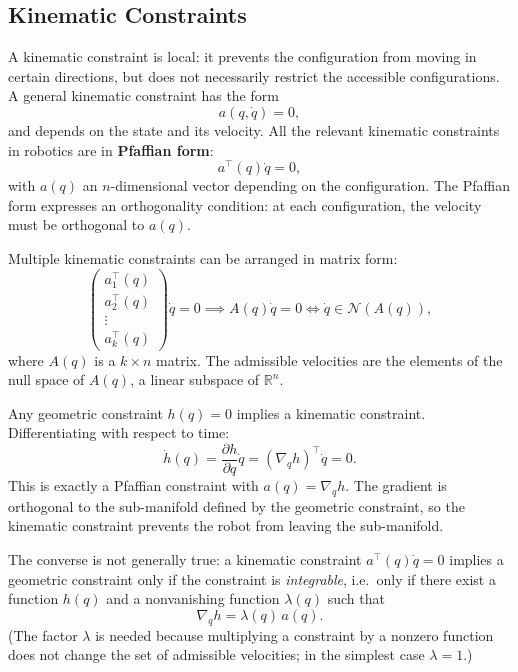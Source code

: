 \subsection{Kinematic Constraints}
\label{subsec:kinematic-constraints}

A kinematic constraint is local: it prevents the configuration from
moving in certain directions, but does not necessarily restrict the
accessible configurations. A general kinematic constraint has the form
\begin{equation}
    a(q, \dot{q}) = 0,
\end{equation}
and depends on the state and its velocity. All the relevant kinematic
constraints in robotics are in \textbf{Pfaffian form}:
\begin{equation}
\label{eq:pfaffian}
    a^\top(q) \dot{q} = 0,
\end{equation}
with \( a(q) \) an \( n \)-dimensional vector depending on the
configuration. The Pfaffian form expresses an orthogonality condition:
at each configuration, the velocity must be orthogonal to \( a(q) \).

Multiple kinematic constraints can be arranged in matrix form:
\begin{equation}
\begin{pmatrix}
    a_1^\top(q) \\
    a_2^\top(q) \\
    \vdots \\
    a_k^\top(q)
\end{pmatrix}
\dot{q} = 0
\implies
A(q) \dot{q} = 0
\iff
\dot{q} \in \mathcal{N}(A(q)),
\end{equation}
where \( A(q) \) is a \( k \times n \) matrix. The admissible
velocities are the elements of the null space of \( A(q) \), a linear
subspace of \( \mathbb{R}^n \).

\begin{nb}
Any geometric constraint \( h(q) = 0 \) implies a kinematic
constraint. Differentiating with respect to time:
\[
\dot{h}(q) = \frac{\partial h}{\partial q} \dot{q}
           = (\nabla_q h)^\top \dot{q} = 0.
\]
This is exactly a Pfaffian constraint with
\( a(q) = \nabla_q h \). The gradient is orthogonal to the
sub-manifold defined by the geometric constraint, so the kinematic
constraint prevents the robot from leaving the sub-manifold.
\end{nb}

The converse is not generally true: a kinematic constraint
\( a^\top(q) \dot{q} = 0 \) implies a geometric constraint only if
the constraint is \emph{integrable}, i.e.\ only if there exist a
function \( h(q) \) and a nonvanishing function \( \lambda(q) \) such
that
\begin{equation}
\label{eq:integrability}
    \nabla_q h = \lambda(q)\, a(q).
\end{equation}
(The factor \( \lambda \) is needed because multiplying a constraint by
a nonzero function does not change the set of admissible velocities;
in the simplest case \( \lambda = 1 \).)

